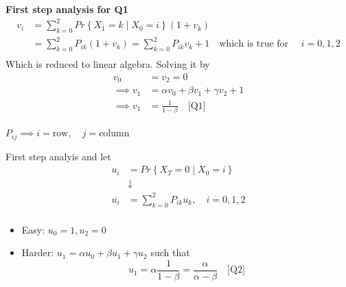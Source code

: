 \documentclass{article}
\theoremstyle{remark}
\begin{document}
   \textbf{First step analysis for Q1}
   \[
     \begin{split}
   v_{i}  & = \sum_{k=0}^{2}  Pr \left \{ X_{1} = k  \mid  X_{0} = i \right \}  \left( 1 + v_{k} \right) \\
&= \sum_{k=0}^{2}  P_{ik} \left( 1+ v_{k} \right) = \sum_{k=0}^{2} P_{ik} v_{k} +1 \quad  \text{which is true for } \quad i = 0,1,2   \\
     \end{split}
   \]
   Which is reduced to linear algebra. Solving it by \[
   \begin{split}
     v_{0} &=  v_{2} = 0 \\
     \implies  v_{1} &= \alpha  v_{0} + \beta v_{1} + \gamma v_{2} + 1 \\
     \implies  v_{1} &=  \frac{1}{ 1- \beta } \quad  \text{[Q1]}  \\
   \end{split}
   \]
   \begin{tcolorbox}
     $P_{ij} \implies  i = \text{row} , \quad j = \text{column} $
   \end{tcolorbox}
   First step analyis and let \[
     \begin{split}
   u_{i}  & = Pr \left \{ X_{T} = 0  \mid  X_{0} = i \right \}  \\
     &  \downarrow \\
   u_{i} &= \sum_{k=0}^{2}  P_{ik} u_{k}, \quad i = 0,1,2   \\
     \end{split}
   \]
     \begin{itemize}
       \item Easy: $u_{0} = 1, u_{2} =0$
       \item Harder: $u_{1} = \alpha  u_{0} + \beta u_{1} + \gamma u_{2}$ such that \[
           u_{1} = \alpha \frac{1}{1- \beta }  = \frac{\alpha }{\alpha  - \beta }  \quad \text{[Q2]}
       \]
     \end{itemize}
\end{document}

